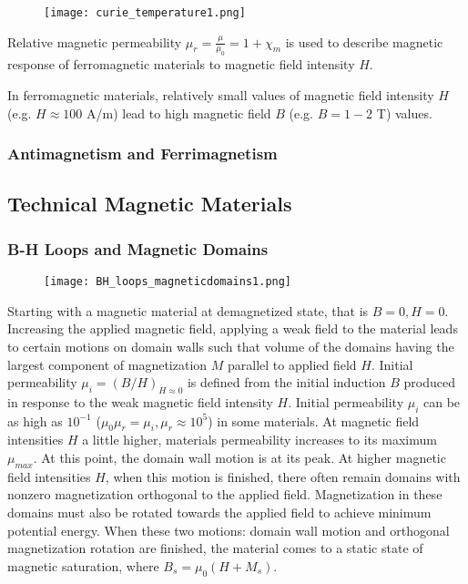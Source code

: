\begin{figure}[h]
    \centering
    \texttt{[image: curie\_temperature1.png]}
\end{figure}


Relative magnetic permeability $\mu_r=\frac{\mu}{\mu_{0}}=1+\chi_{m}$ is used to describe magnetic response of ferromagnetic materials to magnetic field intensity $H$. 

In ferromagnetic materials, relatively small values of magnetic field intensity $H$ (e.g. $H \approx 100$ A/m) lead to high magnetic field $B$ (e.g. $B=1-2$ T) values.


\subsubsection{Antimagnetism and Ferrimagnetism}


\subsection{Technical Magnetic Materials}

\subsubsection{B-H Loops and Magnetic Domains}

\begin{figure}[h]
    \centering
    \texttt{[image: BH\_loops\_magneticdomains1.png]}
\end{figure}

Starting with a magnetic material at demagnetized state, that is $B=0,H=0$. Increasing the applied magnetic field, applying a weak field to the material leads to certain motions on domain walls such that volume of the domains having the largest component of magnetization $M$ parallel to applied field $H$. Initial permeability $\mu_{i}=(B/H)_{H \approx 0}$ is defined from the initial induction $B$ produced in response to the weak magnetic field intensity $H$. Initial permeability $\mu_{i}$ can be as high as $10^{-1}$ ($\mu_{0} \mu_{r} = \mu_{i}, \mu_{r} \approx 10^{5}$) in some materials. At magnetic field intensities $H$ a little higher, materials permeability increases to its maximum $\mu_{max}$. At this point, the domain wall motion is at its peak. At higher magnetic field intensities $H$, when this motion is finished, there often remain domains with nonzero magnetization orthogonal to the applied field. Magnetization in these domains must also be rotated towards the applied field to achieve minimum potential energy. When these two motions: domain wall motion and orthogonal magnetization rotation are finished, the material comes to a static state of magnetic saturation, where $B_{s} = \mu_{0} (H+M_{s})$.

